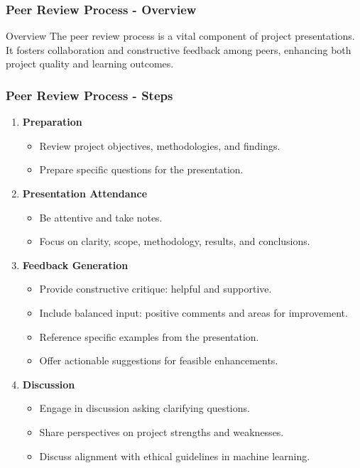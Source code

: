 \documentclass[aspectratio=169]{beamer}
\begin{document}
\begin{frame}[fragile]
    \frametitle{Peer Review Process - Overview}
    \begin{block}{Overview}
        The peer review process is a vital component of project presentations. 
        It fosters collaboration and constructive feedback among peers, enhancing both project quality and learning outcomes.
    \end{block}
\end{frame}

\begin{frame}[fragile]
    \frametitle{Peer Review Process - Steps}
    \begin{enumerate}
        \item \textbf{Preparation}
            \begin{itemize}
                \item Review project objectives, methodologies, and findings.
                \item Prepare specific questions for the presentation.
            \end{itemize}
        
        \item \textbf{Presentation Attendance}
            \begin{itemize}
                \item Be attentive and take notes.
                \item Focus on clarity, scope, methodology, results, and conclusions.
            \end{itemize}
        
        \item \textbf{Feedback Generation}
            \begin{itemize}
                \item Provide constructive critique: helpful and supportive.
                \item Include balanced input: positive comments and areas for improvement.
                \item Reference specific examples from the presentation.
                \item Offer actionable suggestions for feasible enhancements.
            \end{itemize}
        
        \item \textbf{Discussion}
            \begin{itemize}
                \item Engage in discussion asking clarifying questions.
                \item Share perspectives on project strengths and weaknesses.
                \item Discuss alignment with ethical guidelines in machine learning.
            \end{itemize}
        

\end{enumerate}
\end{frame}
\end{document}
